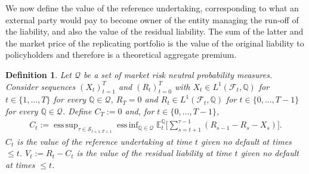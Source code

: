 \documentclass[11pt,a4paper]{article}
\newtheorem{definition}{Definition}
\newcommand{\E}{\mathbb{E}}
\DeclareMathOperator*{\esssup}{ess\,sup}
\DeclareMathOperator*{\essinf}{ess\,inf}
\newcommand{\Q}{\mathbb{Q}}
\newcommand{\calF}{\mathcal{F}}
\newcommand{\calQ}{\mathcal{Q}}
\begin{document}
We now define the value of the reference undertaking, corresponding to what an external party would pay to become owner of the entity managing the run-off of the liability, and also the value of the residual liability. The sum of the latter and the market price of the replicating portfolio is the value of the original liability to policyholders and therefore is a theoretical aggregate premium.  

\begin{definition}\label{Ct-definition}
Let $\calQ$ be a set of market risk neutral probability measures.
Consider sequences $(X_t)_{t=1}^T$ and $(R_t)_{t=0}^T$ with $X_t\in L^{1}(\calF_t,\Q)$ for $t\in \{1,\dots,T\}$ for every $\Q\in\calQ$, $R_T=0$ and $R_t\in L^{1}(\calF_t,\Q)$ for $t\in \{0,\dots,T-1\}$ for every $\Q\in\calQ$. Define 
$C_T :=0$ and, for $t\in \{0,\dots,T-1\}$, 
\begin{align}
C_t := \esssup_{\tau \in \mathcal{S}_{t+1,T+1}}\essinf_{\Q \in \calQ}\E_t^{\Q}\bigg[\sum_{s=t+1}^{\tau-1}(R_{s-1}-R_s-X_s) \bigg].  \label{Ct-expression} 
\end{align}
$C_t$ is \emph{the value of the reference undertaking at time $t$} given no default at times $\leq t$. 
$V_t:=R_t-C_t$ is \emph{the value of the residual liability at time $t$} given no default at times $\leq t$. 
\end{definition}
\end{document}
